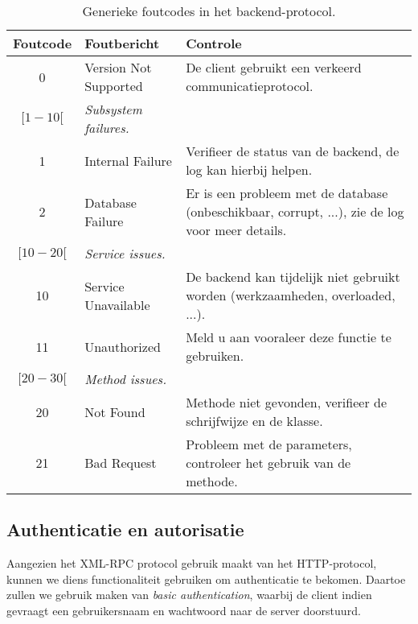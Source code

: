 \begin{table}
\begin{tabular}{| c p{5cm} p{7cm} |}
	\hline
	Foutcode & Foutbericht & Controle \\
	\hline
	
	0 & Version Not Supported & De client gebruikt een verkeerd communicatieprotocol. \\
	\hline
	
	$[1-10[$ & \emph{Subsystem failures.} & \\
	1 & Internal Failure & Verifieer de status van de backend, de log kan hierbij helpen. \\
	2 & Database Failure & Er is een probleem met de database (onbeschikbaar, corrupt, ...), zie de log voor meer details. \\
	\hline
	
	$[10-20[$ & \emph{Service issues.} & \\
	10 & Service Unavailable & De backend kan tijdelijk niet gebruikt worden (werkzaamheden, overloaded, ...). \\
	11 & Unauthorized & Meld u aan vooraleer deze functie te gebruiken. \\
	\hline
	
	$[20-30[$ & \emph{Method issues.} & \\
	20 & Not Found & Methode niet gevonden, verifieer de schrijfwijze en de klasse. \\
	21 & Bad Request & Probleem met de parameters, controleer het gebruik van de methode. \\
	\hline
\end{tabular}
\caption{Generieke foutcodes in het backend-protocol.}
\end{table}

\subsection{Authenticatie en autorisatie}

Aangezien het XML-RPC protocol gebruik maakt van het HTTP-protocol, kunnen we diens functionaliteit gebruiken om authenticatie te bekomen. Daartoe zullen we gebruik maken van \emph{basic authentication}, waarbij de client indien gevraagt een gebruikersnaam en wachtwoord naar de server doorstuurd.


